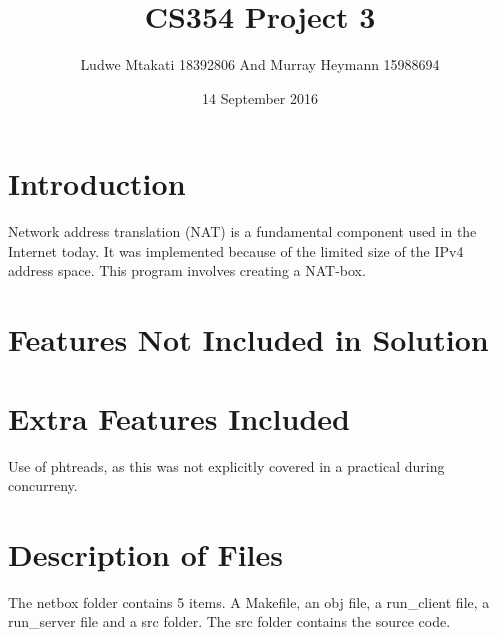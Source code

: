 \documentclass{article}
\title{CS354 Project 3}
\author{Ludwe Mtakati 18392806 And Murray Heymann 15988694}
\date{14 September 2016}
\begin{document}
\maketitle
\newpage
\section{Introduction}
Network address translation (NAT) is a fundamental component used in the Internet today. It was implemented
because of the limited size of the IPv4 address space.
This program involves creating a NAT-box.
\section{Features Not Included in Solution}
 
\section{Extra Features Included}
Use of phtreads, as this was not explicitly covered in a practical during concurreny. 

\section{Description of Files}
The netbox folder contains 5 items. A Makefile, an obj file, a run\_client file, a run\_server file and a src folder. The src folder contains the source code. 
\end{document}
